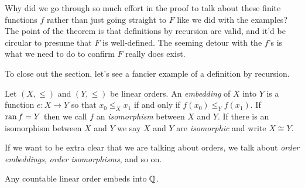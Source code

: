 \documentclass[10pt]{amsart}
\begin{document}
Why did we go through so much effort in the proof to talk about these finite functions $f$ rather than just going straight to $F$ like we did with the examples? The point of the theorem is that definitions by recursion are valid, and it'd be circular to presume that $F$ is well-defined. The seeming detour with the $f$'s is what we need to do to confirm $F$ really does exist.
\smallskip


To close out the section, let's see a fancier example of a definition by recursion. 

\begin{definition}
Let $(X,\le)$ and $(Y,\le)$ be linear orders. An \emph{embedding} of $X$ into $Y$ is a function $e : X \to Y$ so that $x_0 \le_X x_1$ if and only if $f(x_0) \le_Y f(x_1)$. If $\operatorname{ran} f = Y$ then we call $f$ an \emph{isomorphism} between $X$ and $Y$. If there is an isomorphism between $X$ and $Y$ we say $X$ and $Y$ are \emph{isomorphic} and write $X \cong Y$.

If we want to be extra clear that we are talking about orders, we talk about \emph{order embeddings}, \emph{order isomorphisms}, and so on.
\end{definition}

\begin{theorem}[Cantor]
Any countable linear order embeds into $\mathbb{Q}$.
\end{theorem}
\end{document}

